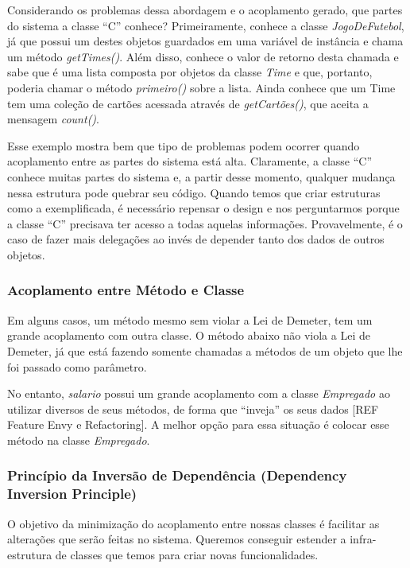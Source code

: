 Considerando os problemas dessa abordagem e o acoplamento gerado, que partes do sistema a classe ``C'' conhece? Primeiramente, conhece a classe \textit{JogoDeFutebol}, já que possui um destes objetos guardados em uma variável de instância e chama um método \textit{getTimes()}. Além disso, conhece o valor de retorno desta chamada e sabe que é uma lista composta por objetos da classe \textit{Time} e que, portanto, poderia chamar o método \textit{primeiro()} sobre a lista. Ainda conhece que um Time tem uma coleção de cartões acessada através de \textit{getCartões()}, que aceita a mensagem \textit{count()}.
	
Esse exemplo mostra bem que tipo de problemas podem ocorrer quando acoplamento entre as partes do sistema está alta. Claramente, a classe ``C'' conhece muitas partes do sistema e, a partir desse momento, qualquer mudança nessa estrutura pode quebrar seu código. Quando temos que criar estruturas como a exemplificada, é necessário repensar o design e nos perguntarmos porque a classe ``C'' precisava ter acesso a todas aquelas informações. Provavelmente, é o caso de fazer mais delegações ao invés de depender tanto dos dados de outros objetos.

\subsubsection{Acoplamento entre Método e Classe}
Em alguns casos, um método mesmo sem violar a Lei de Demeter, tem um grande acoplamento com outra classe.
O método abaixo não viola a Lei de Demeter, já que está fazendo somente chamadas a métodos de um objeto que lhe foi passado como parâmetro.



No entanto, \textit{salario} possui um grande acoplamento com a classe \textit{Empregado} ao utilizar diversos de seus métodos, de forma que ``inveja'' os seus dados [REF Feature Envy e Refactoring]. A melhor opção para essa situação é colocar esse método na classe \textit{Empregado}.

\subsubsection{Princípio da Inversão de Dependência (Dependency Inversion Principle)}
O objetivo da minimização do acoplamento entre nossas classes é facilitar as alterações que serão feitas no sistema. Queremos conseguir estender a infra-estrutura de classes que temos para criar novas funcionalidades.
	
